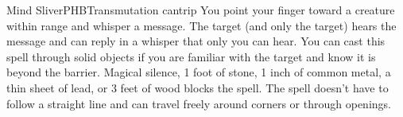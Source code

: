 \begin{spell}{Mind Sliver}{PHB}{Transmutation cantrip}
{
}
You point your finger toward a creature within range and
whisper a message. The target (and only the target) hears
the message and can reply in a whisper that only you can
hear. You can cast this spell through solid objects if you
are familiar with the target and know it is beyond the
barrier. Magical silence, 1 foot of stone, 1 inch of common
metal, a thin sheet of lead, or 3 feet of wood blocks the
spell. The spell doesn't have to follow a straight line and
can travel freely around corners or through openings.
\end{spell}
